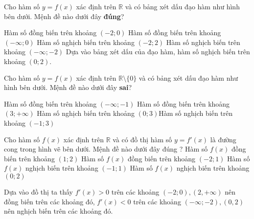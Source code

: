 \begin{ex}%
 Cho hàm số $y=f(x)$ xác định trên $\mathbb{R}$ và có bảng xét dấu đạo hàm như hình bên dưới. Mệnh đề nào dưới đây \textbf{đúng}?
 \begin{center}
 \end{center}
 \choice
 {Hàm số đồng biến trên khoảng $(-2;0 )$}
 {Hàm số đồng biến trên khoảng $(-\infty;0 )$}
 {\True Hàm số nghịch biến trên khoảng $(-2;2 )$}
 {Hàm số nghịch biến trên khoảng $(-\infty;-2)$}
 \loigiai
 {Dựa vào bảng xét dấu của đạo hàm, hàm số nghịch biến trên khoảng $(0;2 )$. }
\end{ex}
\begin{ex}%
 Cho hàm số $y=f(x)$ xác định trên $\mathbb{R}\setminus\{0 \}$ và có bảng xét dấu đạo hàm như hình bên dưới. Mệnh đề nào dưới đây \textbf{sai}?
 \begin{center}
 \end{center}
 \choice
 {Hàm số đồng biến trên khoảng $(-\infty;-1 )$}
 {Hàm số đồng biến trên khoảng $(3;+\infty )$}
 {Hàm số nghịch biến trên khoảng $(0;3)$}{\True Hàm số nghịch biến trên khoảng $(-1;3)$}
\end{ex}
\begin{ex}%
 \immini
 {
 Cho hàm số $f(x)$ xác định trên $\mathbb{R}$ và có đồ thị hàm số $y=f'(x)$ là đường cong trong hình vẽ bên dưới. Mệnh đề nào dưới đây đúng ?
 \choice
 {Hàm số $f(x)$ đồng biến trên khoảng $(1;2)$ }
 {Hàm số $f(x)$ đồng biến trên khoảng $(-2;1)$}
 {Hàm số $f(x)$ nghịch biến trên khoảng $(-1;1)$ }
 {\True Hàm số $f(x)$ nghịch biến trên khoảng $(0;2)$}
 }
 {
 }
 \loigiai
 {
 Dựa vào đồ thị ta thấy $f'(x)> 0 $ trên các khoảng $(-2;0), (2,+\infty)$ nên đồng biến trên các khoảng đó, $f'(x)<0$ trên các khoảng $(-\infty;-2), (0,2)$ nên nghịch biến trên các khoảng đó.
 }
\end{ex}
